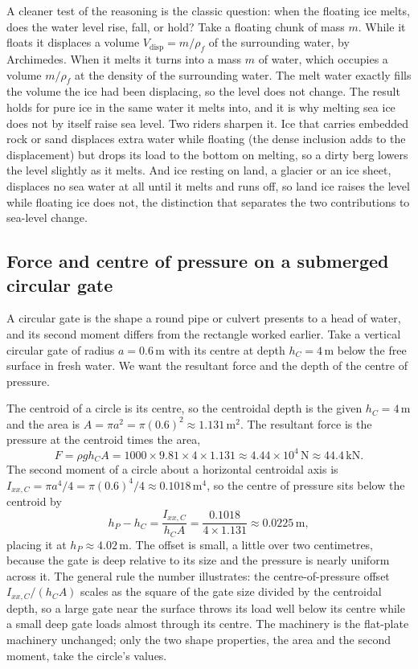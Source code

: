 A cleaner test of the reasoning is the classic question: when the floating
ice melts, does the water level rise, fall, or hold? Take a floating chunk
of mass $m$. While it floats it displaces a volume $V_{\text{disp}} = m/
\rho_f$ of the surrounding water, by Archimedes. When it melts it turns into
a mass $m$ of water, which occupies a volume $m/\rho_f$ at the density of
the surrounding water. The melt water exactly fills the volume the ice had
been displacing, so the level does not change. The result holds for pure
ice in the same water it melts into, and it is why melting sea ice does not
by itself raise sea level. Two riders sharpen it. Ice that carries embedded
rock or sand displaces extra water while floating (the dense inclusion adds
to the displacement) but drops its load to the bottom on melting, so a
dirty berg lowers the level slightly as it melts. And ice resting on land,
a glacier or an ice sheet, displaces no sea water at all until it melts and
runs off, so land ice raises the level while floating ice does not, the
distinction that separates the two contributions to sea-level change.



\subsection{Force and centre of pressure on a submerged circular gate}

A circular gate is the shape a round pipe or culvert presents to a head of
water, and its second moment differs from the rectangle worked earlier.
Take a vertical circular gate of radius $a = 0.6\,\si{\meter}$ with its
centre at depth $h_C = 4\,\si{\meter}$ below the free surface in fresh
water. We want the resultant force and the depth of the centre of pressure.

The centroid of a circle is its centre, so the centroidal depth is the
given $h_C = 4\,\si{\meter}$ and the area is $A = \pi a^2 = \pi (0.6)^2
\approx 1.131\,\text{m}^2$. The resultant force is the pressure at the
centroid times the area,
\[
F = \rho g h_C A
= 1000 \times 9.81 \times 4 \times 1.131
\approx 4.44 \times 10^4\,\text{N}
\approx 44.4\,\text{kN}.
\]
The second moment of a circle about a horizontal centroidal axis is
$I_{xx,C} = \pi a^4/4 = \pi (0.6)^4/4 \approx 0.1018\,\text{m}^4$, so the
centre of pressure sits below the centroid by
\[
h_P - h_C = \frac{I_{xx,C}}{h_C A}
= \frac{0.1018}{4 \times 1.131}
\approx 0.0225\,\si{\meter},
\]
placing it at $h_P \approx 4.02\,\si{\meter}$. The offset is small, a little
over two centimetres, because the gate is deep relative to its size and the
pressure is nearly uniform across it. The general rule the number
illustrates: the centre-of-pressure offset $I_{xx,C}/(h_C A)$ scales as the
square of the gate size divided by the centroidal depth, so a large gate
near the surface throws its load well below its centre while a small deep
gate loads almost through its centre. The machinery is the flat-plate
machinery unchanged; only the two shape properties, the area and the second
moment, take the circle's values.

